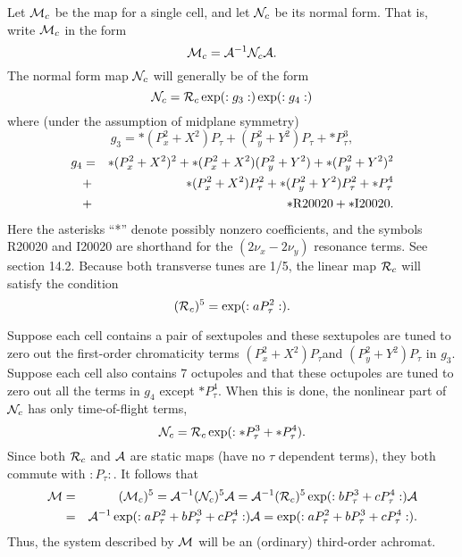 Let ${\cal M}_c$ be the map for a single cell, and let ${\cal N}_c$ be
its normal form.  That is, write ${\cal M}_c$ in the form
\begin{equation}
{\cal M}_c = {\cal A}^{-1} {\cal N}_c {\cal A}.
\end{equation}
The normal form map ${\cal N}_c$ will generally be of the form
\begin{equation}
{\cal N}_c = {\cal R}_c \exp (:g_3:) \exp (:g_4:)
\end{equation}
where (under the assumption of midplane symmetry)
\begin{equation}
g_3 = * (P^2_x + X^2) P_{\tau} + (P^2_y + Y^2) P_{\tau} + *P^3_{\tau},
\end{equation}
\begin{eqnarray}
g_4 &=& * (P^2_x + X^2)^2 + *(P^2_x + X^2)(P^2_y + Y^2) + *(P^2_y
+ Y^2)^2 \nonumber \\
&+& *(P^2_x + X^2) P^2_{\tau} + *(P^2_y + Y^2) P^2_{\tau} + *P^4_{\tau} \nonumber \\
&+& *{\rm R}20020 + *{\rm I}20020.
\end{eqnarray}
Here the asterisks ``*'' denote possibly nonzero coefficients, and the
symbols R20020 and I20020 are shorthand for the $(2\nu_x - 2\nu_y)$ resonance
terms.  See section 14.2.  Because both transverse tunes are 1/5, the
linear map ${\cal R}_c$ will satisfy the condition
\begin{equation}
({\cal R}_c)^5 = \exp (:aP^2_{\tau}:).
\end{equation}

Suppose each cell contains a pair of sextupoles and these sextupoles are
tuned to zero out the first-order chromaticity terms $(P^2_x + X^2)
P_{\tau}$and $(P^2_y + Y^2) P_{\tau}$ in $g_3$.  Suppose each cell also
contains 7 octupoles and that these octupoles are tuned to zero out all
the terms in $g_4$ except $*P^4_{\tau}$.  When this is done, the
nonlinear part of ${\cal N}_c$ has only time-of-flight terms,
\begin{equation}
{\cal N}_c = {\cal R}_c \exp (:*P^3_{\tau} + *P^4_{\tau}).
\end{equation}
Since both ${\cal R}_c$ and ${\cal A}$ are static maps (have no $\tau$
dependent terms), they both commute with $:P_{\tau}:$.  It follows that
\begin{eqnarray}
{\cal M} &=& ({\cal M}_c)^5 = {\cal A}^{-1}({\cal N}_c)^5{\cal A} = {\cal
A}^{-1}({\cal R}_c)^5 \exp (:bP^3_{\tau} + cP^4_{\tau}:) {\cal A}
\nonumber \\
&=& {\cal A}^{-1} \exp (:aP^2_{\tau} + bP^3_{\tau} + cP^4_{\tau}:) {\cal
A} = \exp (:aP^2_{\tau} + bP^3_{\tau} + cP^4_{\tau}:).
\end{eqnarray}
Thus, the system described by ${\cal M}$ will be an (ordinary)
third-order achromat.

